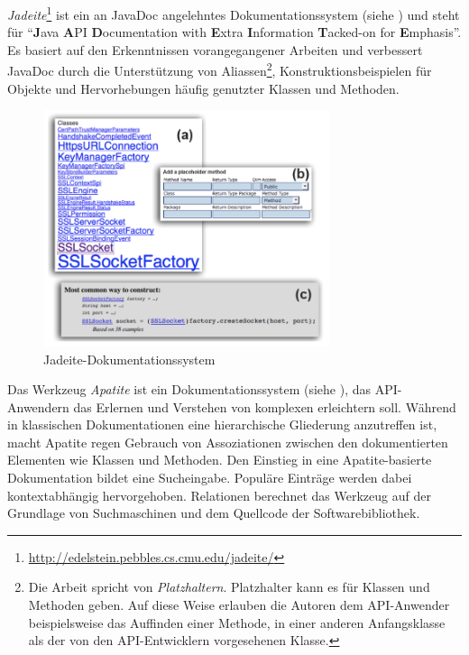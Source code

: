 \begin{important}
\textit{Jadeite}\label{sec:Jadeite}\footnote{\url{http://edelstein.pebbles.cs.cmu.edu/jadeite/}} \citep{Stylos:2009gc} ist ein an JavaDoc angelehntes Dokumentationssystem (siehe ) und steht für ``\textbf{J}ava \textbf{A}PI \textbf{D}ocumentation with \textbf{E}xtra \textbf{I}nformation \textbf{T}acked-on for \textbf{E}mphasis''. Es basiert auf den Erkenntnissen vorangegangener Arbeiten \citep[insb. ][]{Furnas:1987hl,Stylos:2007jb,Stylos:2008jt} und verbessert JavaDoc durch die Unterstützung von Aliassen\footnote{Die Arbeit spricht von \textit{Platzhaltern}. Platzhalter kann es für Klassen und Methoden geben. Auf diese Weise erlauben die Autoren dem API-Anwender beispielsweise das Auffinden einer Methode, in einer anderen Anfangsklasse als der von den API-Entwicklern vorgesehenen Klasse.}, Konstruktionsbeispielen für Objekte und Hervorhebungen häufig genutzter Klassen und Methoden.
\end{important}

\begin{figure}[ht!]
  \centering
    \includegraphics[width=0.75\textwidth]{Figures/tools/jadeite.png}
  \caption{Jadeite-Dokumentationssystem \citep{Stylos:2009gc}}
  \label{fig:jadeite}
\end{figure}


Das Werkzeug \textit{Apatite} \citep{Eisenberg:2010bm,Eisenberg:2010ds} ist ein Dokumentationssystem (siehe ), das API-Anwendern das Erlernen und Verstehen von komplexen  erleichtern soll. Während in klassischen Dokumentationen eine hierarchische Gliederung anzutreffen ist, macht Apatite regen Gebrauch von Assoziationen zwischen den dokumentierten Elementen wie Klassen und Methoden. Den Einstieg in eine Apatite-basierte Dokumentation bildet eine Sucheingabe. Populäre Einträge werden dabei kontextabhängig hervorgehoben. Relationen berechnet das Werkzeug auf der Grundlage von Suchmaschinen und dem Quellcode der Softwarebibliothek.

